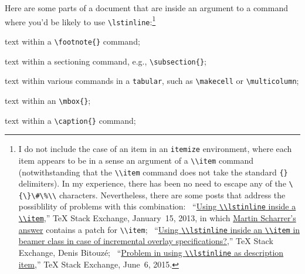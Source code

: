 \documentclass[12pt,table,final]{article}%
\DeclareRobustCommand{\escapableCharactersJdrLst}{\lstinline|\{\}\#\%\\|\xspace}
\begin{document}
Here are some parts of a document that are inside an argument to a command where you'd be likely to use \lstinline|\lstinline|:\footnote{I do not include the case of an item in an \lstinline|itemize| environment, where each item appears to be in  a sense an argument of a \lstinline|\\item| command (notwithstanding that the \lstinline|\\item| command does not take the standard \lstinline|{}| delimiters). In my experience, there has been no need to escape any of the \escapableCharactersJdrLst characters. Nevertheless, there are some posts that address the possiblility of problems with this combination: ~``\href{https://tex.stackexchange.com/questions/93944/using-lstinline-inside-a-item}{Using \lstinline|\\lstinline| inside a \lstinline|\\item|},'' \TeX{} Stack Exchange, January~15, 2013, in which \href{https://tex.stackexchange.com/a/93950/7922}{Martin Scharrer's answer} contains a patch for \lstinline|\\item|; ~``\href{https://tex.stackexchange.com/questions/406577/using-lstinline-inside-an-item-in-beamer-class-in-case-of-incremental-overlay}{Using \lstinline|\\lstinline| inside an \lstinline|\\item| in beamer class in case of incremental overlay specifications?},'' \TeX{} Stack Exchange, Denis Bitouzé; ~``\href{https://tex.stackexchange.com/questions/248886/problem-in-using-lstinline-as-description-item}{Problem in using \lstinline|\\lstinline| as description item},'' \TeX{} Stack Exchange, June~6, 2015.}
\begin{jdr_itemize}
  \item text within a \lstinline|\footnote{}| command;
  \item text within a sectioning command, e.g., \lstinline|\subsection{}|;
  \item text within various commands in a \lstinline|tabular|, such as \lstinline|\makecell| or \lstinline|\multicolumn|;
  \item text within an \lstinline|\mbox{}|;
  \item text within a \lstinline|\caption{}| command;
\end{jdr_itemize}
\end{document}
